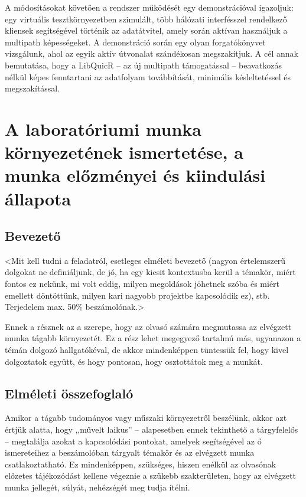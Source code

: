 \documentclass[a4paper,oneside]{article}
\begin{document}
\begin{titlepage}
{  A módosításokat követően a rendszer működését egy demonstrációval 
  igazoljuk: egy virtuális tesztkörnyezetben szimulált, több hálózati 
  interfésszel rendelkező kliensek segítségével történik az adatátvitel, 
  amely során aktívan használjuk a multipath képességeket. A demonstráció 
  során egy olyan forgatókönyvet vizsgálunk, ahol az egyik aktív 
  útvonalat szándékosan megszakítjuk. 
  A cél annak bemutatása, hogy a LibQuicR – az új multipath támogatással – 
  beavatkozás nélkül képes fenntartani az adatfolyam 
  továbbítását, minimális késleltetéssel és megszakítással.}

 
  
 
\end{titlepage} 

\section{A laboratóriumi munka környezetének ismertetése,
     a munka előzményei és kiindulási állapota}
\label{sec:kornyezet}
\subsection{Bevezető}
\label{sec:bevezeto}

<Mit kell tudni a feladatról, esetleges elméleti bevezető (nagyon
értelemszerű dolgokat ne definiáljunk, de jó, ha egy kicsit
kontextusba kerül a témakör, miért fontos ez nekünk, mi volt eddig,
milyen megoldások jöhetnek szóba és miért emellett döntöttünk, milyen
kari nagyobb projektbe kapcsolódik ez), stb. Terjedelem max. 50\%
beszámolónak.>

Ennek a résznek az a szerepe, hogy az olvasó számára megmutassa az
elvégzett munka tágabb környezetét. Ez a rész lehet megegyező tartalmú
más, ugyanazon a témán dolgozó hallgatókéval, de akkor mindenképpen
tüntessük fel, hogy kivel dolgoztatok együtt, és hogy pontosan, hogy
osztottátok meg a munkát.

\subsection{Elméleti összefoglaló}

Amikor a tágabb tudományos vagy műszaki környezetről beszélünk, akkor
azt értjük alatta, hogy ,,művelt laikus'' -- alapesetben ennek
tekinthető a tárgyfelelős -- megtalálja azokat a kapcsolódási
pontokat, amelyek segítségével az ő ismereteihez a beszámolóban
tárgyalt témakör és az elvégzett munka csatlakoztatható.  Ez
mindenképpen, szükséges, hiszen enélkül az olvasónak előzetes
tájékozódást kellene végeznie a szűkebb szakterületen, hogy az
elvégzett munka jellegét, súlyát, nehézségét meg tudja ítélni.
\end{document}
